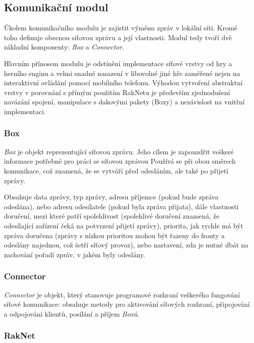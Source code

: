 \documentclass[thesis=B,czech,hidelinks]{FITthesis}[2012/06/26] %
\begin{document}
\subsection{Komunikační modul}

Úkolem komunikačního modulu je zajistit výměnu zpráv v lokální síti. Kromě toho definuje obecnou síťovou zprávu a její vlastnosti. Modul tedy tvoří dvě základní komponenty: \textit{Box} a \textit{Connector}. 

Hlavním přínosem modulu je odstínění implementace síťové vrstvy od hry a herního enginu a velmi snadné nasazení v libovolné jiné hře zaměřené nejen na interaktivní ovládání pomocí mobilního telefonu. Výhodou vytvoření abstraktní vrstvy v porovnání s přímým použitím RakNetu je především zjednodušení navázání spojení, manipulace s dakovými pakety (Boxy) a nezávislost na vnitřní implementaci.


\subsubsection{Box}

\textit{Box} je objekt reprezentující síťovou zprávu. Jeho cílem je zapouzdřit veškeré informace potřebné pro práci se síťovou zprávou Používá se při obou směrech komunikace, což znamená, že se vytváří před odesláním, ale také po přijetí zprávy.

Obsahuje data zprávy, typ zprávy, adresu příjemce (pokud bude zpráva odeslána), nebo adresu odesílatele (pokud byla zpráva přijata), dále vlastnosti doručení, mezi které patří spolehlivost (spolehlivé doručení znamená, že odesílající zařízení čeká na potvrzení přijetí zprávy), priorita, jak rychle má být zpráva doručena (zprávy s nízkou prioritou mohou být řazeny do fronty a odeslány najednou, což šetří síťový provoz), nebo nastavení, zda je nutné dbát na zachování pořadí zpráv, v jakém byly odeslány.

\subsubsection{Connector}

\textit{Connector} je objekt, který stanovuje programové rozhraní veškerého fungování síťové komunikace: obsahuje metody pro aktivování síťových rozhraní, připojování a odpojování klientů, posílání a příjem \textit{Boxů}. 

\subsubsection{RakNet}
\end{document}
